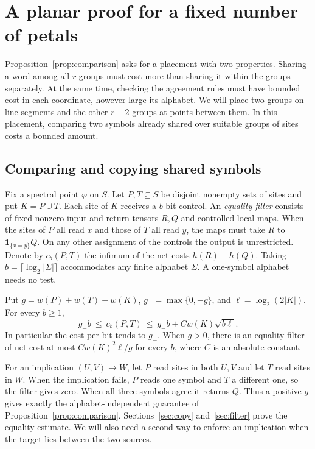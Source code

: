\section{A planar proof for a fixed number of petals}\label{sec:plane}
Proposition~\ref{prop:comparison} asks for a placement with two properties.
Sharing a word among all \(r\) groups must cost more than sharing it
within the groups separately. At the same time, checking the agreement
rules must have bounded cost in each coordinate, however large its
alphabet. We will place two groups on line segments and the other
\(r-2\) groups at points between them. In this placement, comparing
two symbols already shared over suitable groups of sites costs a bounded
amount.

\subsection{Comparing and copying shared symbols}
Fix a spectral point \(\varphi\) on \(S\). Let \(P,T\subseteq S\) be
disjoint nonempty sets of sites and put \(K=P\cup T\). Each site of \(K\)
receives a \(b\)-bit control. An \emph{equality filter} consists of
fixed nonzero input and return tensors \(R,Q\) and controlled local maps.
When the sites of \(P\) all read \(x\) and those of \(T\) all read \(y\),
the maps must take \(R\) to \(\mathbf 1_{\{x=y\}}Q\). On any other
assignment of the controls the output is unrestricted. Denote by
\(c_b(P,T)\) the infimum of the net costs \(h(R)-h(Q)\).
Taking \(b=\lceil\log_2|\Sigma|\rceil\) accommodates any finite alphabet
\(\Sigma\). A one-symbol alphabet needs no test.

\par{}
\begin{theorem}\label{thm:filter}
Put \(g=w(P)+w(T)-w(K)\), \(g_-=\max\{0,-g\}\), and
\(\ell=\log_2(2|K|)\). For every \(b\ge1\),
\[
        g_- b\ \le\ c_b(P,T)\
             \le\ g_- b+Cw(K)\sqrt{b\ell}.
\]
In particular the cost per bit tends to \(g_-\). When \(g>0\), there
is an equality filter of net cost at most \(Cw(K)^2\ell/g\) for every
\(b\), where \(C\) is an absolute constant.
\end{theorem}

For an implication \((U,V)\to W\), let \(P\) read sites in both \(U,V\)
and let \(T\) read sites in \(W\). When the implication fails, \(P\)
reads one symbol and \(T\) a different one, so the filter gives zero.
When all three symbols agree it returns \(Q\). Thus a positive \(g\)
gives exactly the alphabet-independent guarantee of
Proposition~\ref{prop:comparison}. Sections~\ref{sec:copy} and~\ref{sec:filter}
prove the equality estimate. We will also need a second way to enforce
an implication when the target lies between the two sources.

